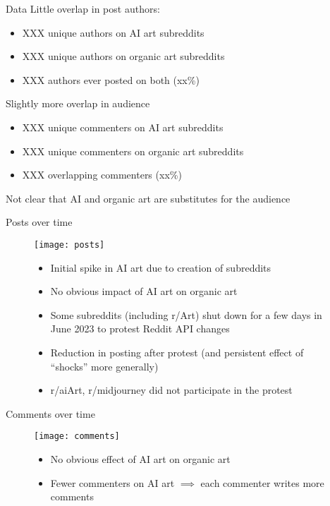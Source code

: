 \documentclass[aspectratio=169]{beamer}
\def\defaultscalefig{0.4}
\begin{document}
\begin{frame}{Data}
Little overlap in post authors:
	\begin{itemize}
		\item XXX unique authors on AI art subreddits
		\item XXX unique authors on organic art subreddits
		\item XXX authors ever posted on both (xx\%)
	\end{itemize}
Slightly more overlap in audience
	\begin{itemize}
		\item XXX unique commenters on AI art subreddits
		\item XXX unique commenters on organic art subreddits
		\item XXX overlapping commenters (xx\%)
	\end{itemize}
Not clear that AI and organic art are substitutes for the audience
\end{frame}

\begin{frame}{Posts over time}
	\begin{figure}
		\begin{minipage}{0.45\textwidth}
			\centering
			\texttt{[image: posts]}
		\end{minipage}\hfill
		\begin{minipage}{0.45\textwidth}
			\centering
			\begin{itemize}
				\item Initial spike in AI art due to creation of subreddits
				\item No obvious impact of AI art on organic art
				\item Some subreddits (including r/Art) shut down for a few days in June 2023 to protest Reddit API changes
				\item Reduction in posting after protest
					(and persistent effect of ``shocks'' more generally)
				\item r/aiArt, r/midjourney did not participate in the protest
			\end{itemize}
		\end{minipage}
	\end{figure}
\end{frame}

\begin{frame}{Comments over time}
	\begin{figure}
		\begin{minipage}{0.45\textwidth}
			\centering
			\texttt{[image: comments]}
		\end{minipage}\hfill
		\begin{minipage}{0.45\textwidth}
			\centering
			\begin{itemize}
				\item No obvious effect of AI art on organic art
				\item Fewer commenters on AI art
					$\implies$ each commenter writes more comments
			\end{itemize}
		\end{minipage}
	\end{figure}
\end{frame}
\end{document}
